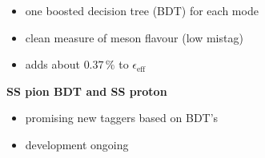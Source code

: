 {\begin{minipage}{0.474\boxwidth}
\begin{itemize}
\item one boosted decision tree (BDT) for each mode
\item clean measure of \B meson flavour (low mistag) 
\item adds about $0.37\,\%$ to $\epsilon_{\text{eff}}$
\end{itemize}
\vspace{0.3em}
\textbf{SS pion BDT and SS proton}
\vspace{-0.1em}
\begin{itemize}
\setlength\itemsep{0.01em}
\item promising new taggers based on BDT's
\item development ongoing
\end{itemize}
\vspace{-0.75em}
\end{minipage}
}




